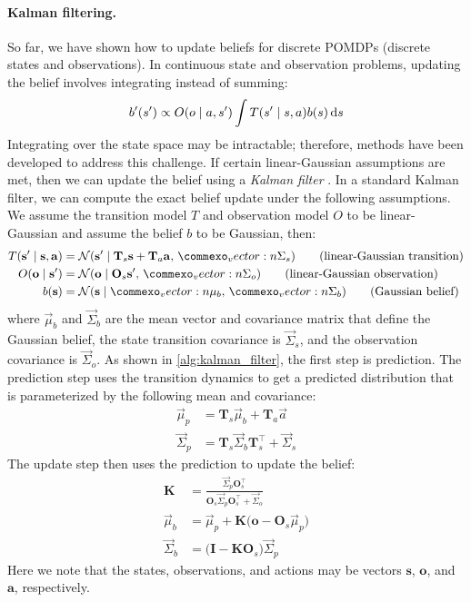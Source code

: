 \paragraph{Kalman filtering.}
So far, we have shown how to update beliefs for discrete POMDPs (discrete states and observations).
In continuous state and observation problems, updating the belief involves integrating instead of summing:
\begin{equation}
    b'(s') \propto O(o \mid a, s')\int T(s' \mid s, a)b(s) \mathop{}\!\mathrm{d} s
\end{equation}
Integrating over the state space may be intractable; therefore, methods have been developed to address this challenge.
If certain linear-Gaussian assumptions are met, then we can update the belief using a \textit{Kalman filter} \cite{kalman1960new,welch1995introduction,dmbook}.
In a standard Kalman filter, we can compute the exact belief update under the following assumptions.
We assume the transition model $T$ and observation model $O$ to be linear-Gaussian and assume the belief $b$ to be Gaussian, then:
\begin{align*}
    T(\mathbf{s}^\prime \mid \mathbf s, \mathbf a) &= \mathcal{N}(\mathbf{s}^\prime \mid \mathbf{T}_s \mathbf{s} + \mathbf{T}_a \mathbf{a},\, \mat{\Sigma}_s) \tag{linear-Gaussian transition} \\
    O(\mathbf o \mid \mathbf{s}^\prime) &= \mathcal{N}(\mathbf o \mid \mathbf{O}_s \mathbf{s}^\prime,\, \mat{\Sigma}_o) \tag{linear-Gaussian observation} \\
    b(\mathbf{s}) &= \mathcal{N}(\mathbf{s} \mid \vec{\mu}_b,\, \mat{\Sigma}_b) \tag{Gaussian belief}
\end{align*}
where $\vec{\mu}_b$ and $\vec{\Sigma}_b$ are the mean vector and covariance matrix that define the Gaussian belief, the state transition covariance is $\vec{\Sigma}_s$, and the observation covariance is $\vec{\Sigma}_o$.
As shown in \cref{alg:kalman_filter}, the first step is prediction.
The prediction step uses the transition dynamics to get a predicted distribution that is parameterized by the following mean and covariance:
\begin{align}
    \vec{\mu}_p &= \mathbf{T}_s\vec{\mu}_b + \mathbf{T}_a\vec{a} \tag{predicted mean} \\
    \vec{\Sigma}_p &= \mathbf{T}_s\vec{\Sigma}_b\mathbf{T}_s^\top + \vec{\Sigma}_s \tag{predicted covariance}
\end{align}
The update step then uses the prediction to update the belief:
\begin{align}
    \mathbf{K} &= \frac{\vec{\Sigma}_p\mathbf{O}_s^\top}{\mathbf{O}_s\vec{\Sigma}_p\mathbf{O}_s^\top + \vec{\Sigma}_o} \tag{Kalman gain} \\
    \vec{\mu}_b &= \vec{\mu}_p + \mathbf{K}\big(\mathbf{o} - \mathbf{O}_s\vec{\mu}_p\big) \tag{updated mean} \\
    \vec{\Sigma}_b &= \big(\mathbf{I} - \mathbf{K}\mathbf{O}_s \big)\vec{\Sigma}_p \tag{updated covariance}
\end{align}
Here we note that the states, observations, and actions may be vectors $\mathbf{s}$, $\mathbf{o}$, and $\mathbf{a}$, respectively.

